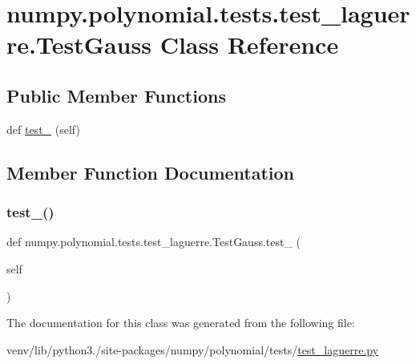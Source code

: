 \hypertarget{classnumpy_1_1polynomial_1_1tests_1_1test__laguerre_1_1TestGauss}{}\section{numpy.\+polynomial.\+tests.\+test\+\_\+laguerre.\+Test\+Gauss Class Reference}
\label{classnumpy_1_1polynomial_1_1tests_1_1test__laguerre_1_1TestGauss}
\subsection*{Public Member Functions}
\begin{DoxyCompactItemize}
\item 
def \hyperlink{classnumpy_1_1polynomial_1_1tests_1_1test__laguerre_1_1TestGauss_a39f1db67e96c5d6469bd0462128f0136}{test\+\_} (self)
\end{DoxyCompactItemize}


\subsection{Member Function Documentation}
\mbox{\label{classnumpy_1_1polynomial_1_1tests_1_1test__laguerre_1_1TestGauss_a39f1db67e96c5d6469bd0462128f0136}} 
\subsubsection{\texorpdfstring{test\+\_()}{test\_100()}}
{\footnotesize\ttfamily def numpy.\+polynomial.\+tests.\+test\+\_\+laguerre.\+Test\+Gauss.\+test\+\_ (\begin{DoxyParamCaption}\item[{}]{self }\end{DoxyParamCaption})}



The documentation for this class was generated from the following file\+:\begin{DoxyCompactItemize}
\item 
venv/lib/python3./site-\/packages/numpy/polynomial/tests/\hyperlink{test__laguerre_8py}{test\+\_\+laguerre.\+py}\end{DoxyCompactItemize}

